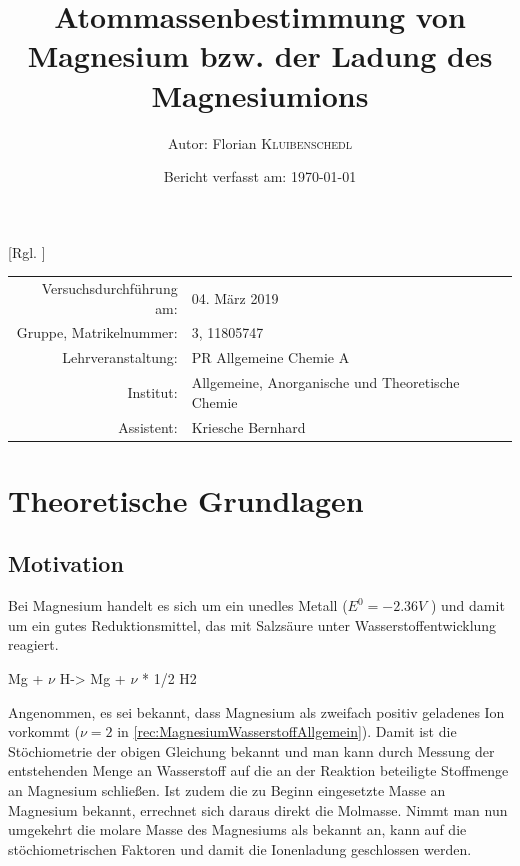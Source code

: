 \documentclass{article}
\title{Atommassenbestimmung von Magnesium bzw. der Ladung des Magnesiumions \cite{Versuchsvorschrift}} %
\author{Autor: Florian \textsc{Kluibenschedl}} %
\date{Bericht verfasst am: \today} %
\begin{document}
  [Rgl. ]{}{}
  
  \maketitle %
  
  \begin{center}
    \begin{tabular}{r p{4cm}}
      Versuchsdurchführung am: & 04. März 2019\\ %
      Gruppe, Matrikelnummer: & 3, 11805747 \\
      Lehrveranstaltung: & PR Allgemeine Chemie A \\
      Institut: & Allgemeine, Anorganische und Theoretische Chemie \\
      Assistent: & Kriesche Bernhard %
    \end{tabular}
  \end{center}


  \begin{abstract}
    
  \end{abstract}
  
  \pagebreak 
  
  \section{Theoretische Grundlagen}
  
    \subsection{Motivation} \label{sec:Motivation}
  Bei Magnesium handelt es sich um ein unedles Metall ($E^{0} = -2.36 V$ \cite[S. 881]{PhysicalChemistryAtkings}) und damit um ein gutes Reduktionsmittel, das mit Salzsäure unter Wasserstoffentwicklung reagiert.   

  \begin{reaction}
    Mg\sld{} + $\nu$ H\pch\aq -> Mg\pch[$\nu$] \aq{} + $\nu$ * 1/2 H2\gas{} \label{rec:MagnesiumWasserstoffAllgemein}
  \end{reaction}
  
  Angenommen, es sei bekannt, dass Magnesium als zweifach positiv geladenes Ion vorkommt ($\nu = 2$ in \ref{rec:MagnesiumWasserstoffAllgemein}). Damit ist die Stöchiometrie der obigen Gleichung bekannt und man kann durch Messung der entstehenden Menge an Wasserstoff auf die an der Reaktion beteiligte Stoffmenge an Magnesium schließen. Ist zudem die zu Beginn eingesetzte Masse an Magnesium bekannt, errechnet sich daraus direkt die Molmasse. Nimmt man nun umgekehrt die molare Masse des Magnesiums als bekannt an, kann auf die stöchiometrischen Faktoren und damit die Ionenladung geschlossen werden. 
  
\end{document}
